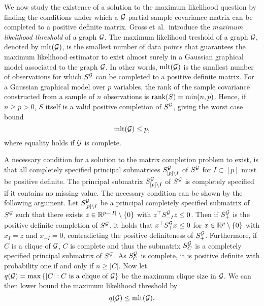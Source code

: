 We now study the existence of a solution to the maximum likelihood question by finding the conditions under which a ${\mathcal{G}}$-partial sample covariance matrix can be completed to a positive definite matrix. Gross et al.\,\cite{10.3150/16-BEJ881} introduce the \textit{maximum likelihood threshold} of a graph ${\mathcal{G}}$. The maximum likelihood treshold of a graph ${\mathcal{G}}$, denoted by ${\textrm{mlt}}({\mathcal{G}})$, is the smallest number of data points that guarantees the maximum likelihood estimator  to exist almost surely in a Gaussian graphical model associated to the graph ${\mathcal{G}}$. In other words, ${\textrm{mlt}}({\mathcal{G}})$ is the smallest number of observations for which $S^{\mathcal{G}}$ can be completed to a positive definite matrix. For a Gaussian graphical model over $p$ variables, the rank of the sample covariance constructed from a sample of $n$ observations is ${\textrm{rank}}(S) = \min(n, p)$. Hence, if $n \geq p > 0$, $S$ itself is a valid positive completion of $S^{\mathcal{G}}$, giving the worst case bound
\begin{equation} \label{eq-pessimistic-mlt}
    {\textrm{mlt}}({\mathcal{G}}) \leq p,
\end{equation}
where equality holds if ${\mathcal{G}}$ is complete.

A necessary condition for a solution to the matrix completion problem to exist, is that all completely specified principal submatrices $S^{\mathcal{G}}_{[p]\setminus I}$ of $S^{\mathcal{G}}$ for $I \subset [p]$ must be positive definite. The principal submatrix $S^{\mathcal{G}}_{[p]\setminus I}$ of $S^{\mathcal{G}}$ is completely specified if it contains no missing value. The necessary condition can be shown by the following argument. Let $S^{\mathcal{G}}_{[p]\setminus I}$ be a principal completely specified submatrix of $S^{\mathcal{G}}$ such that there exists $z \in \mathbb{R}^{p-|I|}\setminus {\left\{0\right\}}$ with $z^\top S^{\mathcal{G}}_{-I} z \leq 0$. Then if $S^{\mathcal{G}}_+$ is the positive definite completion of $S^{\mathcal{G}}$, it holds that $x^\top S^{\mathcal{G}}_+ x \leq 0$ for $x \in \mathbb{R}^p \setminus {\left\{0\right\}}$ with $x_I = z$ and $x_{-I} = 0$, contradicting the positive definiteness of $S^{\mathcal{G}}_+$. Furthermore, if $C$ is a clique of ${\mathcal{G}}$, $C$ is complete and thus the submatrix $S^{\mathcal{G}}_C$ is a completely specified principal submatrix of $S^{\mathcal{G}}$. As $S^{\mathcal{G}}_C$ is complete, it is positive definite with probability one if and only if $n \geq |C|$. Now let $q({\mathcal{G}}) = \max {\left\{|C| : C {\textrm{ is a clique of }} {\mathcal{G}}\right\}}$ be the maximum clique size in ${\mathcal{G}}$. We can then lower bound the maximum likelihood threshold by
\begin{equation} \label{eq-mlt-upper-bound}
    q({\mathcal{G}}) \leq {\textrm{mlt}}({\mathcal{G}}).
\end{equation}

